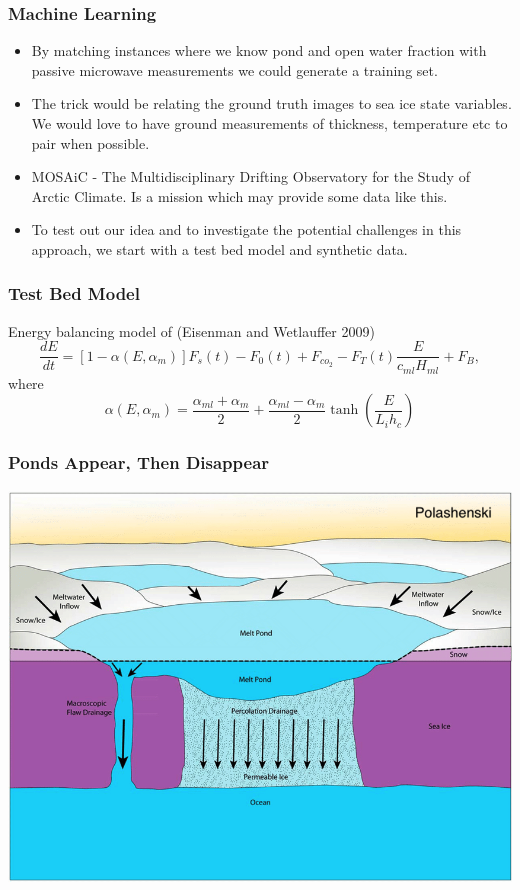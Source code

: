 \documentclass{beamer}
\begin{document}
\begin{frame}
\frametitle{Machine Learning}
\begin{itemize}
	\item By matching instances where we know pond and open water fraction with passive microwave measurements we could generate a training set.
	\item The trick would be relating the ground truth images to sea ice state variables. We would love to have ground measurements of thickness, temperature etc to pair when possible. 

	\item MOSAiC - The Multidisciplinary Drifting Observatory for the Study of Arctic Climate. Is a mission which may provide some data like this.  

	\item To test out our idea and to investigate the potential challenges in this approach, we start with a test bed model and synthetic data.
\end{itemize}
\end{frame}

\begin{frame}
\frametitle{Test Bed Model}
Energy balancing model of (Eisenman and Wetlauffer 2009)
\[\frac{dE}{dt}=[1-\alpha(E,\alpha_{m})]F_s(t)-F_0(t)+F_{co_2}-F_T(t)\frac{E}{c_{ml} H_{ml}}+F_B,\]where
\[\alpha(E,\alpha_m)=\frac{\alpha_{ml}+\alpha_m}{2}+\frac{\alpha_{ml}-\alpha_m}{2}\tanh\left(\frac{E}{L_i h_{c}} \right)\]
\end{frame}

\begin{frame}
\frametitle{Ponds Appear, Then Disappear}
\centering
\includegraphics[width=0.8\linewidth]{Figures/PondsDrain.png}
\end{frame}
\end{document}
